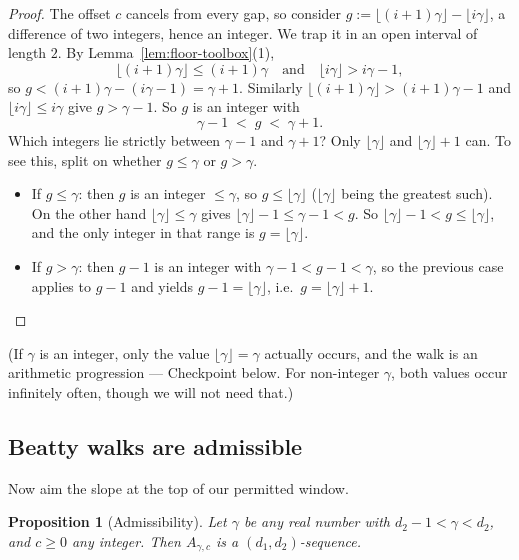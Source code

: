 \documentclass[11pt,reqno]{amsart}
\theoremstyle{plain}
\newtheorem{proposition}[theorem]{Proposition}
\theoremstyle{definition}
\theoremstyle{remark}
\begin{document}
\begin{proof}
The offset $c$ cancels from every gap, so consider
$g := \lfloor (i+1)\gamma \rfloor - \lfloor i\gamma \rfloor$, a difference of two
integers, hence an integer. We trap it in an open interval of length $2$. By
Lemma~\ref{lem:floor-toolbox}(1),
\[
  \lfloor (i+1)\gamma \rfloor \le (i+1)\gamma
  \quad\text{and}\quad
  \lfloor i\gamma \rfloor > i\gamma - 1,
\]
so $g < (i+1)\gamma - (i\gamma - 1) = \gamma + 1$. Similarly
$\lfloor (i+1)\gamma \rfloor > (i+1)\gamma - 1$ and $\lfloor i\gamma \rfloor \le
i\gamma$ give $g > \gamma - 1$. So $g$ is an integer with
\[
  \gamma - 1 \;<\; g \;<\; \gamma + 1 .
\]
Which integers lie strictly between $\gamma - 1$ and $\gamma + 1$? Only
$\lfloor \gamma \rfloor$ and $\lfloor \gamma \rfloor + 1$ can. To see this, split on
whether $g \le \gamma$ or $g > \gamma$.
\begin{itemize}
\item If $g \le \gamma$: then $g$ is an integer $\le \gamma$, so
      $g \le \lfloor \gamma \rfloor$ ($\lfloor \gamma \rfloor$ being the greatest
      such). On the other hand $\lfloor \gamma \rfloor \le \gamma$ gives
      $\lfloor \gamma \rfloor - 1 \le \gamma - 1 < g$. So
      $\lfloor \gamma \rfloor - 1 < g \le \lfloor \gamma \rfloor$, and the only
      integer in that range is $g = \lfloor \gamma \rfloor$.
\item If $g > \gamma$: then $g - 1$ is an integer with
      $\gamma - 1 < g - 1 < \gamma$, so the previous case applies to $g - 1$ and
      yields $g - 1 = \lfloor \gamma \rfloor$, i.e.\ $g = \lfloor \gamma \rfloor + 1$.
\end{itemize}
\end{proof}

(If $\gamma$ is an integer, only the value $\lfloor \gamma \rfloor = \gamma$ actually
occurs, and the walk is an arithmetic progression --- Checkpoint below. For
non-integer $\gamma$, both values occur infinitely often, though we will not need
that.)

\subsection{Beatty walks are admissible}

Now aim the slope at the top of our permitted window.

\begin{proposition}[Admissibility]\label{prop:beatty-admissible}
Let $\gamma$ be any real number with $d_2 - 1 < \gamma < d_2$, and $c \ge 0$ any
integer. Then $A_{\gamma,c}$ is a $(d_1,d_2)$-sequence.
\end{proposition}
\end{document}

